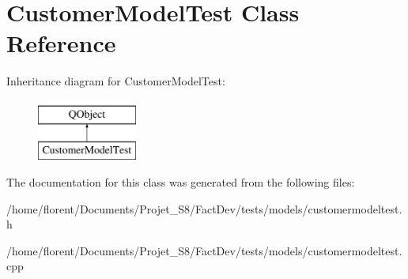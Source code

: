 \hypertarget{classCustomerModelTest}{\section{Customer\-Model\-Test Class Reference}
\label{classCustomerModelTest}
}
Inheritance diagram for Customer\-Model\-Test\-:\begin{figure}[H]
\begin{center}
\leavevmode
\includegraphics[height=2.000000cm]{d5/dcd/classCustomerModelTest}
\end{center}
\end{figure}


The documentation for this class was generated from the following files\-:\begin{DoxyCompactItemize}
\item 
/home/florent/\-Documents/\-Projet\-\_\-\-S8/\-Fact\-Dev/tests/models/customermodeltest.\-h\item 
/home/florent/\-Documents/\-Projet\-\_\-\-S8/\-Fact\-Dev/tests/models/customermodeltest.\-cpp\end{DoxyCompactItemize}
